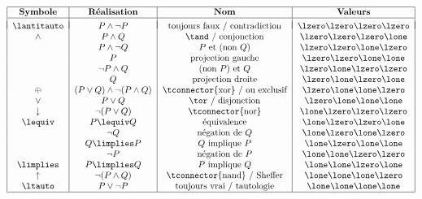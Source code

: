 \documentclass[11pt,class=report,crop=false]{standalone}
\begin{document}
\[
\begin{tabular}{| c | c | c | c |}
	\hline
	\textbf{Symbole} & \textbf{Réalisation} & \textbf{Nom} & \textbf{Valeurs} \\
	\hline
	&&& \\[-2ex]
		
	$\lantitauto$  & $ P \land \lnot P$ & toujours faux / contradiction & \lzero\lzero\lzero\lzero \\  %
	
	$\land$ & $P \land Q$ & \tand / conjonction & \lzero\lzero\lzero\lone \\         %
	
	& $P \land \lnot Q$ & $P$ et (non $Q$) & \lzero\lzero\lone\lzero \\ %
	
	& $P$ & projection gauche & \lzero\lzero\lone\lone \\             %
	
	& $\lnot P \land Q$ & (non $P$) et $Q$ & \lzero\lone\lzero\lzero \\ %
	
	& $Q$ & projection droite & \lzero\lone\lzero\lone \\              %
	
	$\oplus$ & $(P \lor Q) \land \lnot(P\land Q)$ & \tconnector{xor} / ou exclusif & \lzero\lone\lone\lzero \\ %
	
	$\lor$ & $P \lor Q$ & \tor / disjonction & \lzero\lone\lone\lone \\           %
	
	$\downarrow$ & $\lnot(P \lor Q)$ & \tconnector{nor} & \lone\lzero\lzero\lzero \\ %
	
	$\lequiv$ & $P \lequiv Q$ & équivalence & \lone\lzero\lzero\lone \\ %
	
	& $\lnot Q$ & négation de $Q$ & \lone\lzero\lone\lzero \\          %
	
	& $Q \limplies P$ & $Q$ implique $P$ & \lone\lzero\lone\lone \\ %
	
	& $\lnot P$ & négation de $P$ & \lone\lone\lzero\lzero \\          %
	
	$\limplies$      & $ P \limplies Q$ & $P$ implique $Q$ & \lone\lone\lzero\lone \\ %
	
	$\uparrow$ & $\lnot(P \land Q)$ & \tconnector{nand} / Sheffer & \lone\lone\lone\lzero \\ %
	
	$\ltauto$ & $P \lor \lnot P$ & toujours vrai / tautologie & \lone\lone\lone\lone \\ %
	\hline
\end{tabular}
\]
\end{document}

